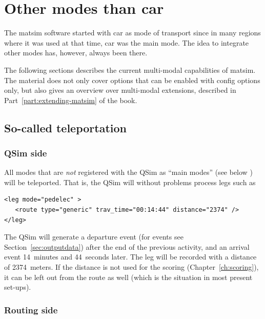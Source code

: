 \section{Other modes than car}



The \gls{matsim} software started with car as mode of transport since in many regions where it was used at that time, car was the main mode.  The idea to integrate other modes has, however, always been there.

The following sections describes the current multi-modal capabilities of \gls{matsim}.  The material does not only cover options that can be enabled with config options only, but also gives an overview over multi-modal extensions, described in Part~\ref{part:extending-matsim} of the book.

\subsection{So-called \gls{teleportation}}

\subsubsection{QSim side}

All modes that are \emph{not} registered with the QSim as ``main modes'' (see below ) will be teleported.  That is, the QSim will without problems process legs such as
\begin{lstlisting}
<leg mode="pedelec" >
   <route type="generic" trav_time="00:14:44" distance="2374" />
</leg>
\end{lstlisting}
The QSim will generate a departure event (for events see Section~\ref{sec:outputdata}) after the end of the previous activity, and an arrival event 14~minutes and 44~seconds later.  The leg will be recorded with a distance of 2374~meters.  If the distance is not used for the scoring (\cf Chapter~\ref{ch:scoring}), it can be left out from the route as well (which is the situation in most present set-ups).

\subsubsection{Routing side}

